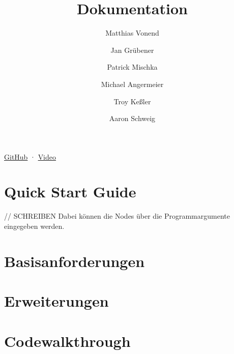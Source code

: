 \documentclass[a4paper]{article}
\title{Dokumentation}
\author{
    Matthias Vonend
    \and
    Jan Grübener
    \and
    Patrick Mischka
    \and
    Michael Angermeier
    \and
    Troy Keßler
    \and
    Aaron Schweig
}
\theoremstyle{definition}
\begin{document}
    \maketitle

    \begin{center}
      \href{https://github.com/aaronschweig/vs-chat/}{GitHub}
      ·
      \href{https://youtu.be/ZKApXYr4j58}{Video}
    \end{center}

    \tableofcontents
    \clearpage

    \author{}
    \section{Quick Start Guide}
    // SCHREIBEN
    Dabei können die Nodes über die Programmargumente eingegeben werden.
    \author{}
    \section{Basisanforderungen}
        
    \author{}
    \section{Erweiterungen}
        
    \clearpage
    \author{}
    \section{Codewalkthrough}
        
    
\end{document}
